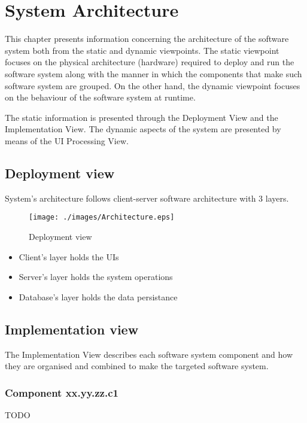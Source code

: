 \chapter{System Architecture}
\label{chap:arch}

This chapter presents information concerning the architecture of the software
system both from the static and dynamic viewpoints. The static viewpoint focuses
on the physical architecture (hardware) required to deploy and run the
software system along with the manner in which the components that make such
software system are grouped. On the other hand, the dynamic viewpoint focuses on
the behaviour of the software system at runtime. 

The static information is presented through the \gls{Deployment View} and the
\gls{Implementation View}. The dynamic aspects of the system are presented by
means of the \gls{UI Processing View}.


\section{Deployment view}
System's architecture follows client-server software architecture with 3 layers.

\begin{figure}
\begin{center}
\texttt{[image: ./images/Architecture.eps]}
\end{center}
\caption{Deployment view}
\end{figure}

\begin{itemize}
  \item Client's layer holds the UIs
  \item Server's layer holds the system operations
  \item Database's layer holds the data persistance
\end{itemize}


\section{Implementation view}
The \gls{Implementation View} describes each software system component and how
they are organised and combined to make the targeted software system.




\subsection{Component xx.yy.zz.c1}
TODO

